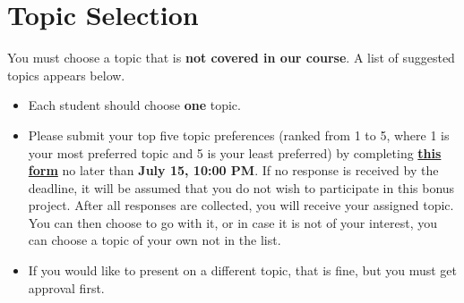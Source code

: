 \documentclass[11pt]{article}
\begin{document}
\section*{Topic Selection}

You must choose a topic that is \textbf{not covered in our course}. A list of suggested topics appears below.

\begin{itemize}[leftmargin=*]
    \item Each student should choose \textbf{one} topic.
   \item Please submit your top five topic preferences (ranked from 1 to 5, where 1 is your most preferred topic and 5 is your least preferred) by completing \href{https://docs.google.com/forms/d/e/1FAIpQLSfvg6vvZpsOBwCKN4fDDVHS_JQB1ARy2ssWJn0CclUVMUgUgw/viewform?usp=dialog}{\textbf{this form}} no later than \textbf{July 15, 10:00 PM}. If no response is received by the deadline, it will be assumed that you do not wish to participate in this bonus project. After all responses are collected, you will receive your assigned topic. You can then choose to go with it, or in case it is not of your interest, you can choose a topic of your own not in the list.
    \item If you would like to present on a different topic, that is fine, but you must get approval first.
\end{itemize}
\end{document}
